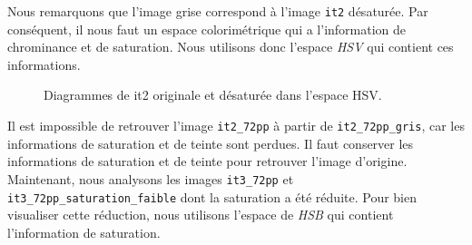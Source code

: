 \documentclass[a4paper,11pt]{article}
\begin{document}
Nous remarquons que l'image grise correspond à l'image \texttt{it2} 
désaturée. Par conséquent, il nous faut un espace colorimétrique qui 
a l'information de chrominance et de saturation. Nous utilisons donc 
l'espace \textit{HSV} qui contient ces informations.

\begin{figure}[H]
  \begin{center}  

    \caption{Diagrammes de it2 originale et désaturée dans l'espace HSV.}
  \end{center}
\end{figure}


Il est impossible de retrouver l'image \texttt{it2\_72pp} à partir de 
\texttt{it2\_72pp\_gris}, car les informations de saturation et de 
teinte sont perdues. Il faut conserver les informations de saturation 
et de teinte pour retrouver l'image d'origine.\\

Maintenant, nous analysons les images \texttt{it3\_72pp} et 
\texttt{it3\_72pp\_saturation\_faible} dont la saturation a été 
réduite. Pour bien visualiser cette réduction, nous utilisons 
l'espace de \textit{HSB} qui contient l'information de saturation.
\end{document}
